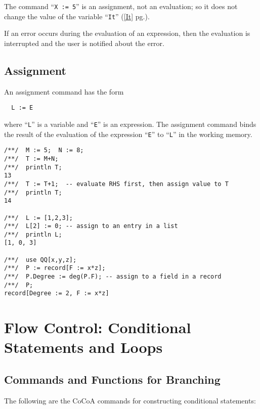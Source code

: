 \documentclass[a4paper]{mybook}
\begin{document}
The command ``\verb&X := 5&'' is an assignment, not an evaluation; so it does
not change the value of the variable ``\verb&It&'' (\ref{It} pg.\pageref{It}).
\par 
If an error occurs during the evaluation of an expression, then the
evaluation is interrupted and the user is notified about the error.


\section{Assignment}
\label{Assignment}

        
An assignment command has the form
\begin{verbatim}
  L := E
\end{verbatim}
where ``\verb&L&'' is a variable and ``\verb&E&'' is an expression.
The assignment command binds the result of the evaluation of the
expression ``\verb&E&'' to ``\verb&L&'' in the working memory.
\begin{Verbatim}[label=example, rulecolor=\color{PineGreen}, frame=single]
/**/  M := 5;  N := 8;
/**/  T := M+N;
/**/  println T;
13
/**/  T := T+1;  -- evaluate RHS first, then assign value to T
/**/  println T;
14

/**/  L := [1,2,3];
/**/  L[2] := 0; -- assign to an entry in a list
/**/  println L;
[1, 0, 3]

/**/  use QQ[x,y,z];
/**/  P := record[F := x*z];
/**/  P.Degree := deg(P.F); -- assign to a field in a record
/**/  P;
record[Degree := 2, F := x*z]
\end{Verbatim}



\chapter{Flow Control: Conditional Statements and Loops}
\label{Flow Control: Conditional Statements and Loops}

      

\section{Commands and Functions for Branching}
\label{Commands and Functions for Branching}

        
The following are the CoCoA commands for constructing conditional
statements:
\end{document}
